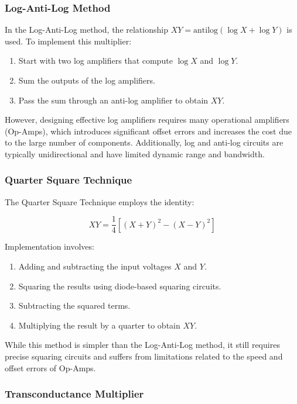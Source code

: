 \subsubsection*{Log-Anti-Log Method}

In the Log-Anti-Log method, the relationship \( XY = \text{antilog}(\log X + \log Y) \) is used. To implement this multiplier:

\begin{enumerate}
    \item Start with two log amplifiers that compute \( \log X \) and \( \log Y \).
    \item Sum the outputs of the log amplifiers.
    \item Pass the sum through an anti-log amplifier to obtain \( XY \).
\end{enumerate}

However, designing effective log amplifiers requires many operational amplifiers (Op-Amps), which introduces significant offset errors and increases the cost due to the large number of components. Additionally, log and anti-log circuits are typically unidirectional and have limited dynamic range and bandwidth.

\subsubsection*{Quarter Square Technique}

The Quarter Square Technique employs the identity:

\[
XY = \frac{1}{4} \left[(X + Y)^2 - (X - Y)^2\right]
\]

Implementation involves:

\begin{enumerate}
    \item Adding and subtracting the input voltages \( X \) and \( Y \).
    \item Squaring the results using diode-based squaring circuits.
    \item Subtracting the squared terms.
    \item Multiplying the result by a quarter to obtain \( XY \).
\end{enumerate}

While this method is simpler than the Log-Anti-Log method, it still requires precise squaring circuits and suffers from limitations related to the speed and offset errors of Op-Amps.

\subsubsection*{Transconductance Multiplier}

